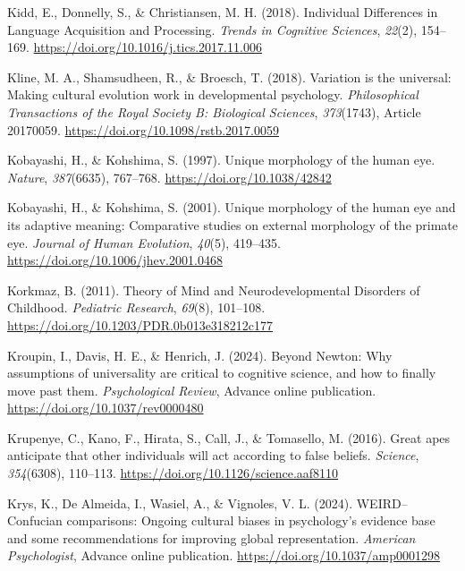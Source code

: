 \documentclass[
]{scrbook}
\newlength{\cslhangindent}
\newenvironment{CSLReferences}[2] %
 {\begin{list}{}{%
  \setlength{\itemindent}{0pt}
  \setlength{\leftmargin}{0pt}
  \setlength{\parsep}{0pt}
  \ifodd #1
   \setlength{\leftmargin}{\cslhangindent}
   \setlength{\itemindent}{-1\cslhangindent}
  \fi
  \setlength{\itemsep}{#2\baselineskip}}}
 {\end{list}}
\begin{document}
\begin{CSLReferences}{1}{0}
Kidd, E., Donnelly, S., \& Christiansen, M. H. (2018). Individual {Differences} in {Language Acquisition} and {Processing}. \emph{Trends in Cognitive Sciences}, \emph{22}(2), 154--169. \url{https://doi.org/10.1016/j.tics.2017.11.006}

Kline, M. A., Shamsudheen, R., \& Broesch, T. (2018). Variation is the universal: Making cultural evolution work in developmental psychology. \emph{Philosophical Transactions of the Royal Society B: Biological Sciences}, \emph{373}(1743), Article 20170059. \url{https://doi.org/10.1098/rstb.2017.0059}

Kobayashi, H., \& Kohshima, S. (1997). Unique morphology of the human eye. \emph{Nature}, \emph{387}(6635), 767--768. \url{https://doi.org/10.1038/42842}

Kobayashi, H., \& Kohshima, S. (2001). Unique morphology of the human eye and its adaptive meaning: Comparative studies on external morphology of the primate eye. \emph{Journal of Human Evolution}, \emph{40}(5), 419--435. \url{https://doi.org/10.1006/jhev.2001.0468}

Korkmaz, B. (2011). Theory of {Mind} and {Neurodevelopmental Disorders} of {Childhood}. \emph{Pediatric Research}, \emph{69}(8), 101--108. \url{https://doi.org/10.1203/PDR.0b013e318212c177}

Kroupin, I., Davis, H. E., \& Henrich, J. (2024). Beyond {Newton}: {Why} assumptions of universality are critical to cognitive science, and how to finally move past them. \emph{Psychological Review}, Advance online publication. \url{https://doi.org/10.1037/rev0000480}

Krupenye, C., Kano, F., Hirata, S., Call, J., \& Tomasello, M. (2016). Great apes anticipate that other individuals will act according to false beliefs. \emph{Science}, \emph{354}(6308), 110--113. \url{https://doi.org/10.1126/science.aaf8110}

Krys, K., De Almeida, I., Wasiel, A., \& Vignoles, V. L. (2024). {WEIRD}--{Confucian} comparisons: {Ongoing} cultural biases in psychology's evidence base and some recommendations for improving global representation. \emph{American Psychologist}, Advance online publication. \url{https://doi.org/10.1037/amp0001298}


\end{CSLReferences}
\end{document}
